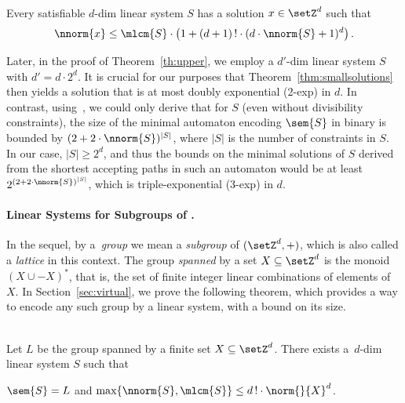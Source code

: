 \begin{thm}\label{thm:smallsolutions}
\hfill\\
	Every satisfiable $d$-dim linear system $S$ 
 has a solution $x\in\setZ^d$ such that
	\[\nnorm{x}\leq
		\mlcm{S} \cdot \left(1+ (d+1)\,!\cdot (d\cdot
		\nnorm{S}+1)^{d}\right).\]
\end{thm}

\begin{rem}
Later, in
the proof of Theorem~\ref{th:upper}, we employ a $d'$-dim linear system $S$
with $d'=d\cdot2^d$. 
It is crucial for our purposes that Theorem~\ref{thm:smallsolutions} then yields a solution that is
	at most doubly exponential (2-exp) in $d$.  
In contrast, using~\cite[Theorem 3.12]{DBLP:journals/tocl/Klaedtke08},
	we could only derive
	that for $S$ (even without divisibility constraints),  
the size of the minimal automaton encoding $\sem{S}$ 
in binary is bounded by $(2+2\cdot\nnorm{S})^{|S|}$,
where $|S|$ is the number of constraints in $S$. In our case, $|S|\geq
2^d$, and thus the bounds on the minimal solutions of $S$ derived from the
shortest accepting paths in such an automaton would be at least
$2^{(2+2\cdot\nnorm{S})^{|S|}}$,
	which is triple-exponential (3-exp) in $d$.
\end{rem}



\paragraph{Linear Systems for Subgroups of .}
In the sequel, by a~\emph{group} we mean 
a \emph{subgroup} of $(\setZ^d,+)$,
which is also called a \emph{lattice} in this context.
The group \emph{spanned} by a set $X\subseteq \setZ^d$ is 
the monoid $(X\cup-X)^*$, that is, the set of finite integer linear
combinations of elements of $X$. 
In Section~\ref{sec:virtual}, we prove the following theorem, which
provides a way to encode any such group by a linear system, with a
bound on its  size.




\begin{thm}\label{thm:virtual2system}
\hfill\\	
Let $L$ be the group spanned by a finite set $X\subseteq
\setZ^d$. There exists a~$d$-dim linear system $S$ such that
\begin{center}
$\sem{S}=L$ and $\max\{\nnorm{S},\mlcm{S}\}\leq d\,!\cdot
	\norm{}{X}^d$.
\end{center}
\end{thm}

